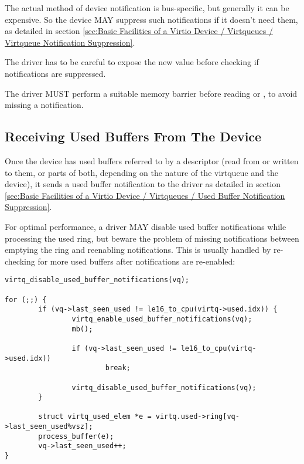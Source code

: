 The actual method of device notification is bus-specific, but generally
it can be expensive.  So the device MAY suppress such notifications if it
doesn't need them, as detailed in section \ref{sec:Basic Facilities of a Virtio Device / Virtqueues / Virtqueue Notification Suppression}.

The driver has to be careful to expose the new 
value before checking if notifications are suppressed.

The driver MUST perform a suitable memory barrier before reading  or
, to avoid missing a notification.

\subsection{Receiving Used Buffers From The Device}\label{sec:Basic Facilities of a Virtio Device / Virtqueues / Receiving Used Buffers From The Device}

Once the device has used buffers referred to by a descriptor (read from or written to them, or
parts of both, depending on the nature of the virtqueue and the
device), it sends a used buffer notification to the driver as detailed
in section \ref{sec:Basic Facilities of a Virtio Device / Virtqueues /
Used Buffer Notification Suppression}.

\begin{note}

For optimal performance, a driver MAY disable used buffer notifications
while processing the used ring, but beware the problem of missing
notifications between emptying the ring and reenabling notifications.  This
is usually handled by re-checking for more used buffers after
notifications are re-enabled:

\begin{lstlisting}
virtq_disable_used_buffer_notifications(vq);

for (;;) {
        if (vq->last_seen_used != le16_to_cpu(virtq->used.idx)) {
                virtq_enable_used_buffer_notifications(vq);
                mb();

                if (vq->last_seen_used != le16_to_cpu(virtq->used.idx))
                        break;

                virtq_disable_used_buffer_notifications(vq);
        }

        struct virtq_used_elem *e = virtq.used->ring[vq->last_seen_used%vsz];
        process_buffer(e);
        vq->last_seen_used++;
}
\end{lstlisting}
\end{note}
